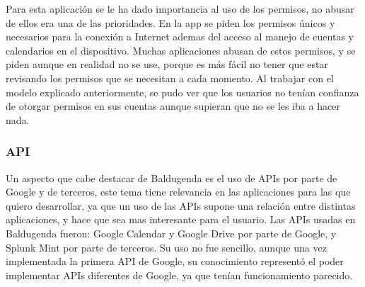 Para esta aplicación se le ha dado importancia al uso de los permisos, no abusar de ellos era una de las prioridades.
En la app se piden los permisos únicos y necesarios para la conexión a Internet ademas del acceso al manejo de cuentas y calendarios en el dispositivo.
Muchas aplicaciones abusan de estos permisos, y se piden aunque en realidad no se use, porque es más fácil no tener que estar revisando los permisos que se necesitan a cada momento.
Al trabajar con el modelo explicado anteriormente, se pudo ver que los usuarios no tenían confianza de otorgar permisos en sus cuentas aunque supieran que no se les iba a hacer nada.

\subsubsection{API}
\label{API}

Un aspecto que cabe destacar de Baldugenda es el uso de APIs por parte de Google y de terceros, este tema tiene relevancia en las aplicaciones para las que quiero desarrollar, ya que un uso de las APIs supone una relación entre distintas aplicaciones, y hace que sea mas interesante para el usuario.
Las APIs usadas en Baldugenda fueron: Google Calendar y Google Drive por parte de Google, y Splunk Mint por parte de terceros. Su uso no fue sencillo, aunque una vez implementada la primera API de Google, su conocimiento representó el poder implementar APIs diferentes de Google, ya que tenían funcionamiento parecido.   






















